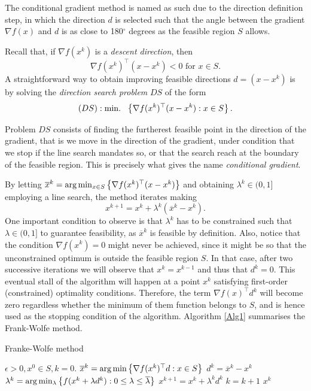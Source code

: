 The conditional gradient method is named as such due to the direction definition step, in which the direction $d$ is selected such that the angle between the gradient $\nabla f(x)$ and $d$ is as close to 180$^\circ$ degrees as the feasible region $S$ allows.

Recall that, if $\nabla f(x^k)$ is a \emph{descent direction}, then 
%
\begin{equation*}
\nabla f(x^k)^\top(x - x^k) < 0 \text{ for } x \in S.
\end{equation*}
%
A straightforward way to obtain improving feasible directions $d = (x - x^k)$ is by solving the \emph{direction search problem} $DS$ of the form
%
\begin{equation*}
(DS) : \mathop{\text{min.~}} ~ \left\{ \nabla f(x^k)^\top (x - x^k) : x \in S \right \}.
\end{equation*}
%

Problem $DS$ consists of finding the furtherest feasible point in the direction of the gradient, that is we move in the direction of the gradient, under condition that we stop if the line search mandates so, or that the search reach at the boundary of the feasible region. This is precisely what gives the name \emph{conditional gradient}.

By letting $\overline{x}^k = \arg\min_{x \in S} \left\{ \nabla f(x^k)^\top (x - x^k) \right \}$ and obtaining $\lambda^k \in (0,1]$ employing a line search, the method iterates making
\begin{equation*}
	x^{k+1} = x^k + \lambda^k(\overline{x}^k - x^k).
\end{equation*}
%
One important condition to observe is that $\lambda^k$ has to be constrained such that $\lambda \in (0,1]$ to guarantee feasibility, as $\overline{x}^k$ is feasible by definition. Also, notice that the condition $\nabla f(x^k) = 0$ might never be achieved, since it might be so that the unconstrained optimum is outside the feasible region $S$. In that case, after two successive iterations we will observe that $x^{k} = x^{k-1}$ and thus that $d^k=0$. This eventual stall of the algorithm will happen at a point $x^k$ satisfying first-order (constrained) optimality conditions. Therefore, the term $\nabla f(x)^\top d^k$ will become zero regardless whether the minimum of them function belongs to $S$, and is hence used as the stopping condition of the algorithm. Algorithm \ref{Alg1} summarises the Frank-Wolfe method.  

\begin{algorithm}[H]
\caption{Franke-Wolfe method} \label{Alg1}
\begin{algorithmic}[1] %
 $\epsilon > 0, x^0 \in S, k = 0$. 
    \State $\overline{x}^k = \arg\min \left\{ \nabla f(x^k)^\top d : x \in S \right \}$ 
    \State $d^k = \overline{x}^k - x^k$
    \State $\lambda^k = \arg\min_\lambda \left\{ f(x^k + \lambda d^k) : 0\leq \lambda \leq \overline{\lambda} \right \}$
    \State $x^{k+1} = x^k + \lambda^k d^k$ 
    \State $k = k+1$
\EndWhile
{} $x^k$
\end{algorithmic}
\end{algorithm}
  
